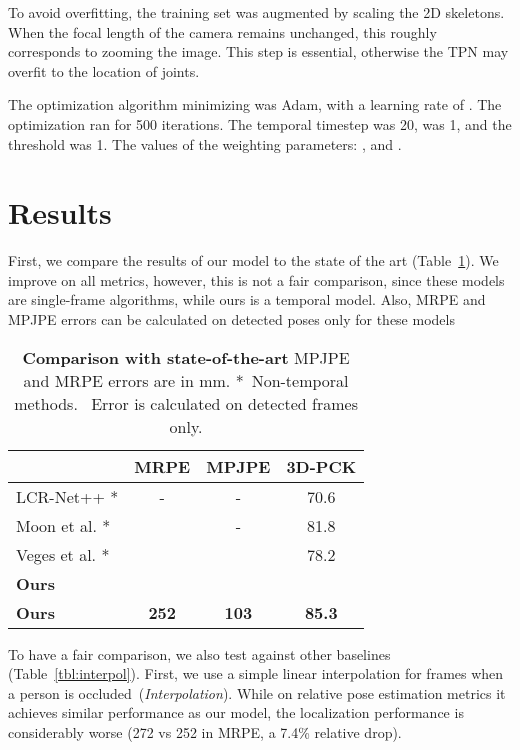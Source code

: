 \documentclass[runningheads, envcountsame, a4paper]{llncs}
\begin{document}
To avoid overfitting, the training set was augmented by scaling the 2D skeletons. When the focal length of the camera remains unchanged, this roughly corresponds to zooming the image. This step is essential, otherwise the TPN may overfit to the  location of joints.

The optimization algorithm minimizing  was Adam, with a learning rate of . The optimization ran for 500 iterations. The temporal timestep  was 20,  was 1, and the threshold  was 1. The values of the weighting parameters: ,  and .


\setlength{\tabcolsep}{6pt}


\section{Results}
First, we compare the results of our model to the state of the art (Table~\ref{tbl:mupots-sota}). We improve on all metrics, however, this is not a fair comparison, since these models are single-frame algorithms, while ours is a temporal model. Also, MRPE and MPJPE errors can be calculated on detected poses only for these models

\begin{table}[h]
\centering
\caption{\textbf{Comparison with state-of-the-art} MPJPE and MRPE errors are in mm. *~Non-temporal methods. ~Error is calculated on detected frames only. }\label{tbl:mupots-sota}
\begin{tabular}{lccc}
 & MRPE  & MPJPE &  3D-PCK \\
\hline
LCR-Net++ \cite{rogez2019lcrpp}* & - & -  &  70.6 \\
Moon et al. \cite{moon2019camdistance}* &  & -  & 81.8 \\ 

Veges et al. \cite{veges2020wdspose}* &  &   & 78.2 \\
\hline
\textbf{Ours} &  &   &  \\
\textbf{Ours} & \textbf{252} & \textbf{103}  & \textbf{85.3} \\
\hline
\end{tabular}
\end{table}

To have a fair comparison, we also test against other baselines (Table~\ref{tbl:interpol}). First, we use a simple linear interpolation for frames when a person is occluded~(\textit{Interpolation}). While on relative pose estimation metrics it achieves similar performance as our model, the localization performance is considerably worse (272 vs 252 in MRPE, a 7.4\% relative drop).
\end{document}

